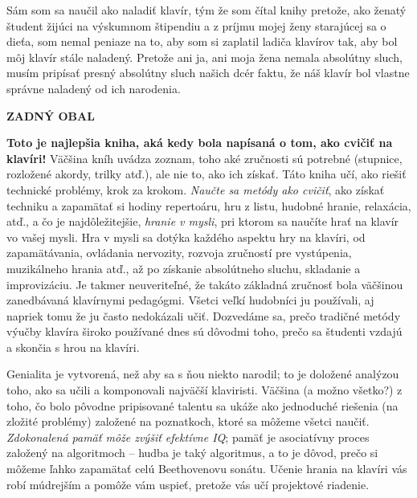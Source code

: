 Sám som sa naučil ako naladiť klavír, tým že som čítal knihy pretože, ako ženatý študent žijúci na výskumnom štipendiu a z príjmu mojej ženy starajúcej sa o dieťa, som nemal peniaze na to, aby som si zaplatil ladiča klavírov tak, aby bol môj klavír stále naladený. Pretože ani ja, ani moja žena nemala absolútny sluch, musím pripísať presný absolútny sluch našich dcér faktu, že náš klavír bol vlastne správne naladený od ich narodenia.

\clearpage
{}
{}
\printindex

\clearpage

\thispagestyle{empty}
\begin{center}
{\large\bf ZADNÝ OBAL}
\end{center}

\vspace*{2em}
\textbf{Toto je najlepšia kniha, aká kedy bola napísaná o tom, ako cvičiť na klavíri!} Väčšina kníh uvádza zoznam, toho aké zručnosti sú potrebné (stupnice, rozložené akordy, trilky atď.), ale nie to, ako ich získať. Táto kniha učí, ako riešiť technické problémy, krok za krokom. \emph{Naučte sa metódy ako cvičiť}, ako získať techniku a zapamätať si hodiny repertoáru, hru z listu, hudobné hranie, relaxácia, atď., a čo je najdôležitejšie, \emph{hranie v mysli}, pri ktorom sa naučíte hrať na klavír vo vašej mysli. Hra v mysli sa dotýka každého aspektu hry na klavíri, od zapamätávania, ovládania nervozity, rozvoja zručností pre vystúpenia, muzikálneho hrania atď., až po získanie absolútneho sluchu, skladanie a improvizáciu. Je takmer neuveriteľné, že takáto základná zručnosť bola väčšinou zanedbávaná klavírnymi pedagógmi. Všetci veľkí hudobníci ju používali, aj napriek tomu že ju často nedokázali učiť. Dozvedáme sa, prečo tradičné metódy výučby klavíra široko používané dnes sú dôvodmi toho, prečo sa študenti vzdajú a skončia s hrou na klavíri.

Genialita je vytvorená, než aby sa s ňou niekto narodil; to je doložené analýzou toho, ako sa učili a komponovali najväčší klaviristi. Väčšina (a možno všetko?) z toho, čo bolo pôvodne pripisované talentu sa ukáže ako jednoduché riešenia (na zložité problémy) založené na poznatkoch, ktoré sa môžeme všetci naučiť. \emph{Zdokonalená pamäť môže zvýšiť efektívne IQ}; pamäť je asociatívny proces založený na algoritmoch – hudba je taký algoritmus, a to je dôvod, prečo si môžeme ľahko zapamätať celú Beethovenovu sonátu. Učenie hrania na klavíri vás robí múdrejším a pomôže vám uspieť, pretože vás učí projektové riadenie.

